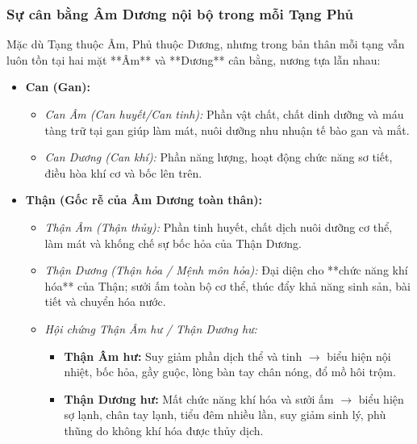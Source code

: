 \subsubsection{Sự cân bằng Âm Dương nội bộ trong mỗi Tạng Phủ}
Mặc dù Tạng thuộc Âm, Phủ thuộc Dương, nhưng trong bản thân mỗi tạng vẫn luôn tồn tại hai mặt **Âm** và **Dương** cân bằng, nương tựa lẫn nhau:

\begin{itemize}
    \item \textbf{Can (Gan):} 
    \begin{itemize}
        \item \textit{Can Âm (Can huyết/Can tinh):} Phần vật chất, chất dinh dưỡng và máu tàng trữ tại gan giúp làm mát, nuôi dưỡng nhu nhuận tế bào gan và mắt.
        \item \textit{Can Dương (Can khí):} Phần năng lượng, hoạt động chức năng sơ tiết, điều hòa khí cơ và bốc lên trên.
    \end{itemize}

    \item \textbf{Thận (Gốc rễ của Âm Dương toàn thân):}
    \begin{itemize}
        \item \textit{Thận Âm (Thận thủy):} Phần tinh huyết, chất dịch nuôi dưỡng cơ thể, làm mát và khống chế sự bốc hỏa của Thận Dương.
        \item \textit{Thận Dương (Thận hỏa / Mệnh môn hỏa):} Đại diện cho **chức năng khí hóa** của Thận; sưởi ấm toàn bộ cơ thể, thúc đẩy khả năng sinh sản, bài tiết và chuyển hóa nước.
        \item \textit{Hội chứng Thận Âm hư / Thận Dương hư:}
        \begin{itemize}
            \item \textbf{Thận Âm hư:} Suy giảm phần dịch thể và tinh $\rightarrow$ biểu hiện nội nhiệt, bốc hỏa, gầy guộc, lòng bàn tay chân nóng, đổ mồ hôi trộm.
            \item \textbf{Thận Dương hư:} Mất chức năng khí hóa và sưởi ấm $\rightarrow$ biểu hiện sợ lạnh, chân tay lạnh, tiểu đêm nhiều lần, suy giảm sinh lý, phù thũng do không khí hóa được thủy dịch.
        \end{itemize}
    \end{itemize}
\end{itemize}

